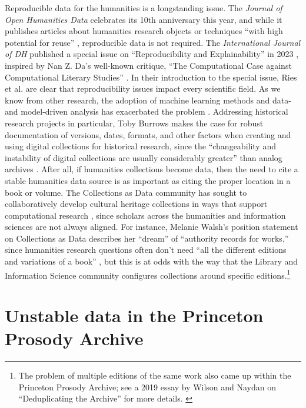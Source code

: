 \documentclass{anthology-ch}         %
\begin{document}
Reproducible data for the humanities is a longstanding issue. The \textit{Journal of Open Humanities Data} celebrates its 10th anniversary this year, and while it publishes articles about humanities research objects or techniques “with high potential for reuse” \cite{noauthor_journal_2025}, reproducible data is not required.  The \textit{International Journal of DH} published a special issue on “Reproducibility and Explainability” in 2023 \cite{ries_reproducibility_2024}, inspired by Nan Z. Da's well-known critique, “The Computational Case against Computational Literary Studies” \cite{da_computational_2019}. In their introduction to the special issue, Ries et al. are clear that reproducibility issues impact every scientific field. As we know from other research, the adoption of machine learning methods and data- and model-driven analysis has exacerbated the problem \cite{kapoor_leakage_2023}.  Addressing historical research projects in particular, Toby Burrows makes the case for robust documentation of versions, dates, formats, and other factors when creating and using digital collections for historical research, since the “changeability and instability of digital collections are usually considerably greater” than analog archives \cite{burrows_reproducibility_2023}. After all, if humanities collections become data, then the need to cite a stable humanities data source is as important as citing the proper location in a book or volume. The Collections as Data community has sought to collaboratively develop cultural heritage collections in ways that support computational research \cite{padilla_collections_2023, padilla_final_2019}, since scholars across the humanities and information sciences are not always aligned. For instance, Melanie Walsh’s position statement on Collections as Data describes her “dream” of “authority records for works,” since humanities research questions often don't need “all the different editions and variations of a book” \cite{chambers_position_2023}, but this is at odds with the way that the Library and Information Science community configures collections around specific editions.\footnote{The problem of multiple editions of the same work also came up within the Princeton Prosody Archive; see a 2019 essay by Wilson and Naydan on “Deduplicating the Archive” for more details. \cite{wilson_deduplicating_2019}} 

\section{Unstable data in the Princeton Prosody Archive}
\end{document}
